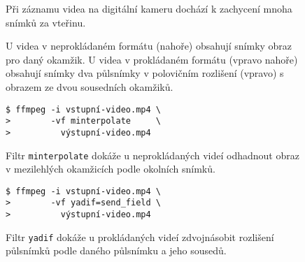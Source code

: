 \begingroup
\begin{subfigure}{\linewidth}

\vspace{-10pt}
\caption{Při záznamu videa na digitální kameru dochází k zachycení mnoha snímků za vteřinu.}
\end{subfigure}
%
\par\vspace{10pt}%
\begin{subfigure}[t]{0.49\linewidth}

\caption{U videa v neprokládaném formátu (nahoře) obsahují snímky obraz pro daný okamžik. U videa v prokládaném formátu (vpravo nahoře) obsahují snímky dva půlsnímky v polovičním rozlišení (vpravo) s obrazem ze dvou sousedních okamžiků.}
\end{subfigure}\hfill
\begin{subfigure}[t]{0.49\linewidth}

\par\vspace{8pt}%

\end{subfigure}
\par\vspace{10pt}%
\begin{subfigure}[t]{0.49\linewidth}
\begin{verbatim}
$ ffmpeg -i vstupní-video.mp4 \
>        -vf minterpolate     \
>          výstupní-video.mp4
\end{verbatim}

\caption{Filtr \texttt{minterpolate} dokáže u neprokládaných videí odhadnout obraz v mezilehlých okamžicích podle okolních snímků.\footnotemark}
\end{subfigure}\hfill
\begin{subfigure}[t]{0.49\linewidth}
\begin{verbatim}
$ ffmpeg -i vstupní-video.mp4 \
>        -vf yadif=send_field \
>          výstupní-video.mp4
\end{verbatim}

\caption{Filtr \texttt{yadif} dokáže u prokládaných videí zdvojnásobit rozlišení půlsnímků podle daného půlsnímku a jeho sousedů.}
\end{subfigure}
\endgroup